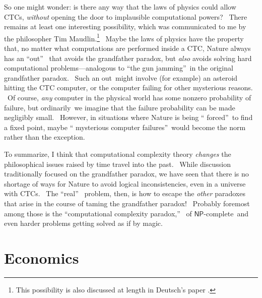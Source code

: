 \documentclass[11pt,onecolumn]{article}%
\begin{document}
So one might wonder: is there any way that the laws of physics could allow
CTCs, \textit{without} opening the door to implausible computational powers?
\ There remains at least one interesting possibility, which was communicated
to me by the philosopher Tim Maudlin.\footnote{This possibility is also
discussed at length in Deutsch's paper \cite{deutsch:ctc}.} \ Maybe the laws
of physics have the property that, no matter what computations are performed
inside a CTC, Nature always has an \textquotedblleft out\textquotedblright%
\ that avoids the grandfather paradox, but \textit{also} avoids solving hard
computational problems---analogous to \textquotedblleft the gun
jamming\textquotedblright\ in the original grandfather paradox. \ Such an
out\ might involve (for example) an asteroid hitting the CTC computer, or the
computer failing for other mysterious reasons. \ Of course, \textit{any}
computer in the physical world has some nonzero probability of failure, but
ordinarily\ we imagine that the failure probability can be made negligibly
small. \ However, in situations where Nature is being \textquotedblleft
forced\textquotedblright\ to find a fixed point, maybe \textquotedblleft
mysterious computer failures\textquotedblright\ would become the norm rather
than the exception.

To summarize, I think that computational complexity theory \textit{changes}
the philosophical issues raised by time travel into the past. \ While
discussion traditionally focused on the grandfather paradox, we have seen that
there is no shortage of ways for Nature to avoid logical inconsistencies, even
in a universe with CTCs. \ The \textquotedblleft real\textquotedblright%
\ problem, then, is how to escape the \textit{other} paradoxes that arise in
the course of taming the grandfather paradox! \ Probably foremost among those
is the \textquotedblleft computational complexity paradox,\textquotedblright%
\ of $\mathsf{NP}$-complete\ and even harder problems getting solved as if by magic.

\section{Economics\label{ECON}}
\end{document}
